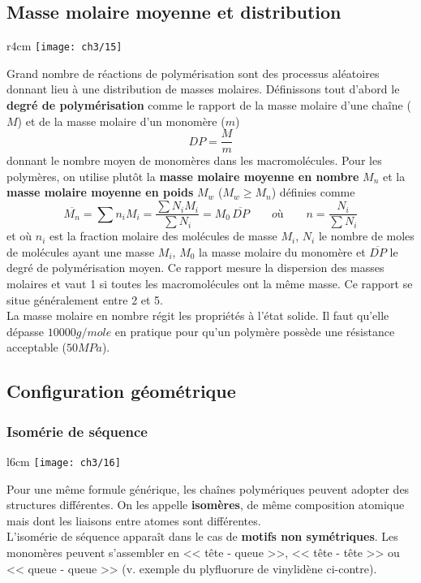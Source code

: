 	\subsection{Masse molaire moyenne et distribution}
		\begin{wrapfigure}[8]{r}{4cm}
		\vspace{-5mm}
		\texttt{[image: ch3/15]}
		\end{wrapfigure}	
		Grand nombre de réactions de polymérisation sont des processus aléatoires donnant lieu à une distribution de masses molaires. Définissons tout d'abord le \textbf{degré de polymérisation} comme le rapport de la masse molaire d'une chaîne ($M$) et de la masse molaire d'un monomère ($m$) 
		\begin{equation}
			DP = \frac{M}{m}
		\end{equation}
		donnant le nombre moyen de monomères dans les macromolécules. Pour les polymères, on utilise plutôt la \textbf{masse molaire moyenne en nombre} $M_n$ et la \textbf{masse molaire moyenne en poids} $M_w$ ($M_w \geq M_n$) définies comme
		\begin{equation}
			\overline{M_n} = \sum  n_i M_i = \frac{\sum N_i M_i}{\sum N_i} = M_0 \, \overline{DP} \qquad où \qquad n = \frac{N_i}{\sum N_i}
		\end{equation}
		et où $n_i$ est la fraction molaire des molécules de masse $M_i$, $N_i$ le nombre de moles de molécules ayant une masse $M_i$, $M_0$ la masse molaire du monomère et $\overline{DP}$ le degré de polymérisation moyen. Ce rapport mesure la dispersion des masses molaires et vaut 1 si toutes les macromolécules ont la même masse. Ce rapport se situe généralement entre 2 et 5. \\
		La masse molaire en nombre régit les propriétés à l'état solide. Il faut qu'elle dépasse $10 000g/mole$ en pratique pour qu'un polymère possède une résistance acceptable ($50MPa$). 
		
	\subsection{Configuration géométrique}
		\subsubsection{Isomérie de séquence}
			\begin{wrapfigure}[8]{l}{6cm}
			\vspace{-5mm}
			\texttt{[image: ch3/16]}
			\end{wrapfigure}	
			Pour une même formule générique, les chaînes polymériques peuvent adopter des structures différentes. On les appelle \textbf{isomères}, de même composition atomique mais dont les liaisons entre atomes sont différentes. \\
			 L'isomérie de séquence apparaît dans le cas de \textbf{motifs non symétriques}. Les monomères peuvent s'assembler en << tête - queue >>, << tête - tête >> ou << queue - queue >> (v. exemple du plyfluorure de vinylidène ci-contre).
			 
